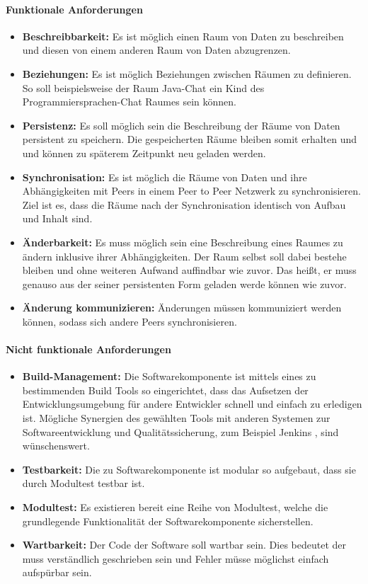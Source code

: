 \documentclass[a4paper]{article}
\begin{document}
	\paragraph{Funktionale Anforderungen}
	\begin{itemize}
		\item \textbf{Beschreibbarkeit:} Es ist möglich einen Raum von
		Daten zu beschreiben und diesen von einem anderen Raum
		von Daten abzugrenzen. 
		\item \textbf{Beziehungen:} Es ist möglich Beziehungen zwischen
		Räumen zu definieren. So soll beispielsweise der Raum Java-Chat ein 
		Kind des Programmiersprachen-Chat Raumes sein können.
		\item \textbf{Persistenz:} Es soll möglich sein die Beschreibung der
		Räume von Daten persistent zu speichern. Die gespeicherten Räume
		bleiben somit erhalten und und können zu späterem Zeitpunkt neu
		geladen werden.
		\item \textbf{Synchronisation:} Es ist möglich die Räume von Daten 
		und ihre Abhängigkeiten mit Peers in einem Peer to Peer Netzwerk 
		zu synchronisieren. Ziel ist es, dass die Räume nach der 
		Synchronisation identisch von Aufbau und Inhalt sind.
		\item \textbf{Änderbarkeit:} Es muss möglich sein eine Beschreibung
		eines Raumes zu ändern inklusive ihrer Abhängigkeiten. Der Raum
		selbst soll dabei bestehe bleiben und ohne weiteren Aufwand auffindbar 
		wie	zuvor. Das heißt, er muss genauso aus der seiner persistenten Form 
		geladen werde können wie zuvor.
		\item \textbf{Änderung kommunizieren:} Änderungen müssen
		kommuniziert werden können, sodass sich andere Peers synchronisieren.
	\end{itemize} 	
	
	\paragraph{Nicht funktionale Anforderungen}
	\begin{itemize}
		\item \textbf{Build-Management:} Die Softwarekomponente ist mittels
		eines zu bestimmenden Build Tools so eingerichtet, dass das Aufsetzen 
		der	Entwicklungsumgebung für andere Entwickler schnell und einfach
		zu erledigen ist. Mögliche Synergien des gewählten Tools mit anderen
		Systemen zur Softwareentwicklung und Qualitätssicherung, zum Beispiel  
		Jenkins \cite{Jenkins}, sind wünschenswert.
		\item \textbf{Testbarkeit:} Die zu Softwarekomponente
		ist modular so aufgebaut, dass sie durch Modultest testbar ist.
		\item \textbf{Modultest:} Es existieren bereit eine Reihe von
		Modultest, welche die grundlegende Funktionalität der 
		Softwarekomponente sicherstellen.
		\item \textbf{Wartbarkeit:} Der Code der Software soll wartbar sein.
		Dies bedeutet der muss verständlich geschrieben sein und Fehler müsse
		möglichst einfach aufspürbar sein.
	\end{itemize} 
	
\end{document}
